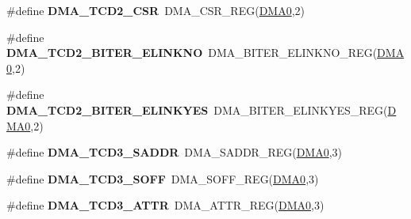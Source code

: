 \begin{DoxyCompactItemize}
\item 
\#define {\bfseries D\+M\+A\+\_\+\+T\+C\+D2\+\_\+\+C\+SR}~D\+M\+A\+\_\+\+C\+S\+R\+\_\+\+R\+EG(\hyperlink{group__DMA__Peripheral__Access__Layer_ga4103044f9ca209772f513dc694513ffb}{D\+M\+A0},2)\hypertarget{group__DMA__Register__Accessor__Macros_ga868475048617575cf190c20189c586ee}{}\label{group__DMA__Register__Accessor__Macros_ga868475048617575cf190c20189c586ee}

\item 
\#define {\bfseries D\+M\+A\+\_\+\+T\+C\+D2\+\_\+\+B\+I\+T\+E\+R\+\_\+\+E\+L\+I\+N\+K\+NO}~D\+M\+A\+\_\+\+B\+I\+T\+E\+R\+\_\+\+E\+L\+I\+N\+K\+N\+O\+\_\+\+R\+EG(\hyperlink{group__DMA__Peripheral__Access__Layer_ga4103044f9ca209772f513dc694513ffb}{D\+M\+A0},2)\hypertarget{group__DMA__Register__Accessor__Macros_gaa27b02c8585b159ffc7b78f32c3d7b2d}{}\label{group__DMA__Register__Accessor__Macros_gaa27b02c8585b159ffc7b78f32c3d7b2d}

\item 
\#define {\bfseries D\+M\+A\+\_\+\+T\+C\+D2\+\_\+\+B\+I\+T\+E\+R\+\_\+\+E\+L\+I\+N\+K\+Y\+ES}~D\+M\+A\+\_\+\+B\+I\+T\+E\+R\+\_\+\+E\+L\+I\+N\+K\+Y\+E\+S\+\_\+\+R\+EG(\hyperlink{group__DMA__Peripheral__Access__Layer_ga4103044f9ca209772f513dc694513ffb}{D\+M\+A0},2)\hypertarget{group__DMA__Register__Accessor__Macros_ga7105375c432e810701dc580bbe2c97f7}{}\label{group__DMA__Register__Accessor__Macros_ga7105375c432e810701dc580bbe2c97f7}

\item 
\#define {\bfseries D\+M\+A\+\_\+\+T\+C\+D3\+\_\+\+S\+A\+D\+DR}~D\+M\+A\+\_\+\+S\+A\+D\+D\+R\+\_\+\+R\+EG(\hyperlink{group__DMA__Peripheral__Access__Layer_ga4103044f9ca209772f513dc694513ffb}{D\+M\+A0},3)\hypertarget{group__DMA__Register__Accessor__Macros_gae015b1c8ea3e04489c82a43512f27ab1}{}\label{group__DMA__Register__Accessor__Macros_gae015b1c8ea3e04489c82a43512f27ab1}

\item 
\#define {\bfseries D\+M\+A\+\_\+\+T\+C\+D3\+\_\+\+S\+O\+FF}~D\+M\+A\+\_\+\+S\+O\+F\+F\+\_\+\+R\+EG(\hyperlink{group__DMA__Peripheral__Access__Layer_ga4103044f9ca209772f513dc694513ffb}{D\+M\+A0},3)\hypertarget{group__DMA__Register__Accessor__Macros_ga15058eb1943489c3a2f36308d61fd628}{}\label{group__DMA__Register__Accessor__Macros_ga15058eb1943489c3a2f36308d61fd628}

\item 
\#define {\bfseries D\+M\+A\+\_\+\+T\+C\+D3\+\_\+\+A\+T\+TR}~D\+M\+A\+\_\+\+A\+T\+T\+R\+\_\+\+R\+EG(\hyperlink{group__DMA__Peripheral__Access__Layer_ga4103044f9ca209772f513dc694513ffb}{D\+M\+A0},3)\hypertarget{group__DMA__Register__Accessor__Macros_ga2782d5194fea9642ce17125a8c1b8e67}{}\label{group__DMA__Register__Accessor__Macros_ga2782d5194fea9642ce17125a8c1b8e67}


\end{DoxyCompactItemize}
